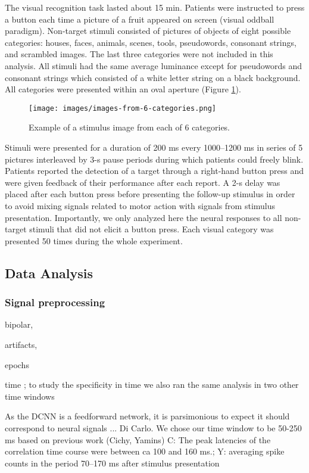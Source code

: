 \documentclass[final]{jneurosci}
\begin{document}
The visual recognition task lasted about 15 min. Patients were instructed to press a button each time a picture of a fruit appeared on screen (visual oddball paradigm). Non-target stimuli consisted of pictures of objects of eight possible categories: houses, faces, animals, scenes, tools, pseudowords, consonant strings, and scrambled images. The last three categories were not included in this analysis. All stimuli had the same average luminance except for pseudowords and consonant strings which consisted of a white letter string on a black background. All categories were presented within an oval aperture (Figure \ref{fig:image-of-each-category}).
\begin{figure}[h]
    \centering
    \texttt{[image: images/images-from-6-categories.png]}
    \caption{Example of a stimulus image from each of 6 categories.}
    \label{fig:image-of-each-category}
\end{figure}
Stimuli were presented for a duration of 200 ms every 1000–1200 ms in series of 5 pictures interleaved by 3-s pause periods during which patients could freely blink. Patients reported the detection of a target through a right-hand button press and were given feedback of their performance after each report. A 2-s delay was placed after each button press before presenting the follow-up stimulus in order to avoid mixing signals related to motor action with signals from stimulus presentation. Importantly, we only analyzed here the neural responses to all non-target stimuli that did not elicit a button press. Each visual category was presented 50 times during the whole experiment.

\subsection{Data Analysis}

\subsubsection{Signal preprocessing}

bipolar, 

artifacts, 

epochs

time ; to study the specificity in time we also ran the same analysis in two other time windows

As the DCNN is a feedforward network, it is parsimonious to expect it should correspond to neural signals ... Di Carlo. We chose our time window to be 50-250 ms based on previous work (Cichy, Yamins) C: The peak latencies of the correlation time course were between ca 100 and 160 ms.; Y: averaging spike counts in the period 70–170 ms after stimulus presentation
\end{document}
